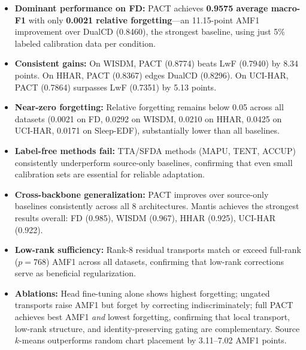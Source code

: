 \documentclass[11pt,a4paper]{article}
\begin{document}
\begin{itemize}
  \item \textbf{Dominant performance on FD:} PACT achieves \textbf{0.9575 average macro-F1} with only \textbf{0.0021 relative forgetting}---an 11.15-point AMF1 improvement over DualCD (0.8460), the strongest baseline, using just 5\% labeled calibration data per condition.
  \item \textbf{Consistent gains:} On WISDM, PACT (0.8774) beats LwF (0.7940) by 8.34 points. On HHAR, PACT (0.8367) edges DualCD (0.8296). On UCI-HAR, PACT (0.7864) surpasses LwF (0.7351) by 5.13 points.
  \item \textbf{Near-zero forgetting:} Relative forgetting remains below 0.05 across all datasets (0.0021 on FD, 0.0292 on WISDM, 0.0210 on HHAR, 0.0425 on UCI-HAR, 0.0171 on Sleep-EDF), substantially lower than all baselines.
  \item \textbf{Label-free methods fail:} TTA/SFDA methods (MAPU, TENT, ACCUP) consistently underperform source-only baselines, confirming that even small calibration sets are essential for reliable adaptation.
  \item \textbf{Cross-backbone generalization:} PACT improves over source-only baselines consistently across all 8 architectures. Mantis achieves the strongest results overall: FD (0.985), WISDM (0.967), HHAR (0.925), UCI-HAR (0.922).
  \item \textbf{Low-rank sufficiency:} Rank-8 residual transports match or exceed full-rank ($p{=}768$) AMF1 across all datasets, confirming that low-rank corrections serve as beneficial regularization.
  \item \textbf{Ablations:} Head fine-tuning alone shows highest forgetting; ungated transports raise AMF1 but forget by correcting indiscriminately; full PACT achieves best AMF1 \emph{and} lowest forgetting, confirming that local transport, low-rank structure, and identity-preserving gating are complementary. Source $k$-means outperforms random chart placement by 3.11--7.02 AMF1 points.
\end{itemize}
\end{document}
